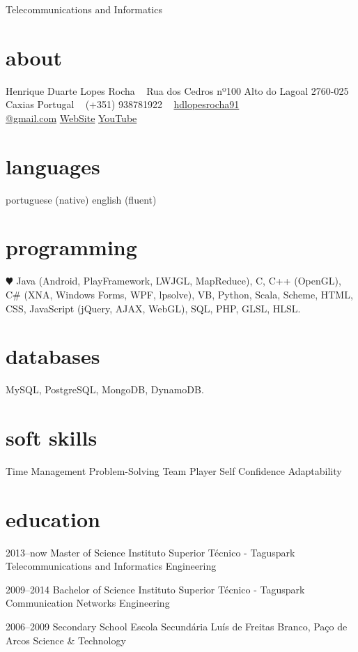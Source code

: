 \documentclass[]{friggeri-cv}
\begin{document}
       {Telecommunications and Informatics}


\begin{aside}
  \section{about}
    Henrique Duarte Lopes Rocha
    ~
    Rua dos Cedros nº100
    Alto do Lagoal
    2760-025 Caxias
    Portugal
    ~
    (+351) 938781922
    ~
    \href{mailto:hdlopesrocha91@gmail.com}{hdlopesrocha91\\@gmail.com}
    \href{http://web.ist.utl.pt/ist168621}{WebSite}
    \href{http://www.youtube.com/user/hdlopesrocha}{YouTube}
  \section{languages}
    portuguese (native)
    english (fluent)
  \section{programming}
    {\color{red} $\varheartsuit$} Java
	 (Android, PlayFramework, LWJGL, MapReduce), C, C++ (OpenGL), C\# (XNA, Windows Forms, WPF, lpsolve), VB, Python, Scala, Scheme, HTML, CSS, JavaScript (jQuery, AJAX, WebGL), SQL, PHP, GLSL, HLSL.  
   \section{databases}
	MySQL, PostgreSQL, MongoDB, DynamoDB.
   \section{soft skills}
	Time Management
	Problem-Solving
	Team Player
	Self Confidence
	Adaptability
\end{aside}

\section{education}

\begin{entrylist}
   \entry
    {2013–now}
    {Master of Science}
    {Instituto Superior Técnico - Taguspark}
    {Telecommunications and Informatics Engineering}
  
   \entry
    {2009–2014}
    {Bachelor of Science}
    {Instituto Superior Técnico - Taguspark}
    {Communication Networks Engineering}

  \entry
    {2006–2009}
    {Secondary School}
    {Escola Secundária Luís de Freitas Branco, Paço de Arcos}
    {Science \& Technology}

\end{entrylist}
\end{document}

